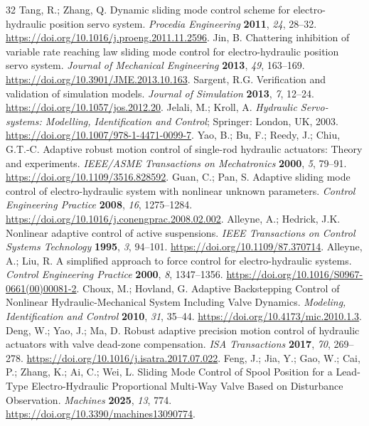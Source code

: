 \begin{thebibliography}{32}
 Tang, R.; Zhang, Q. Dynamic sliding mode control scheme for electro-hydraulic position servo system. \emph{Procedia Engineering} \textbf{2011}, \emph{24}, 28--32. \url{https://doi.org/10.1016/j.proeng.2011.11.2596}.
 Jin, B. Chattering inhibition of variable rate reaching law sliding mode control for electro-hydraulic position servo system. \emph{Journal of Mechanical Engineering} \textbf{2013}, \emph{49}, 163--169. \url{https://doi.org/10.3901/JME.2013.10.163}.
 Sargent, R.G. Verification and validation of simulation models. \emph{Journal of Simulation} \textbf{2013}, \emph{7}, 12--24. \url{https://doi.org/10.1057/jos.2012.20}.
 Jelali, M.; Kroll, A. \emph{Hydraulic Servo-systems: Modelling, Identification and Control}; Springer: London, UK, 2003. \url{https://doi.org/10.1007/978-1-4471-0099-7}.
 Yao, B.; Bu, F.; Reedy, J.; Chiu, G.T.-C. Adaptive robust motion control of single-rod hydraulic actuators: Theory and experiments. \emph{IEEE/ASME Transactions on Mechatronics} \textbf{2000}, \emph{5}, 79--91. \url{https://doi.org/10.1109/3516.828592}.
 Guan, C.; Pan, S. Adaptive sliding mode control of electro-hydraulic system with nonlinear unknown parameters. \emph{Control Engineering Practice} \textbf{2008}, \emph{16}, 1275--1284. \url{https://doi.org/10.1016/j.conengprac.2008.02.002}.
 Alleyne, A.; Hedrick, J.K. Nonlinear adaptive control of active suspensions. \emph{IEEE Transactions on Control Systems Technology} \textbf{1995}, \emph{3}, 94--101. \url{https://doi.org/10.1109/87.370714}.
 Alleyne, A.; Liu, R. A simplified approach to force control for electro-hydraulic systems. \emph{Control Engineering Practice} \textbf{2000}, \emph{8}, 1347--1356. \url{https://doi.org/10.1016/S0967-0661(00)00081-2}.
 Choux, M.; Hovland, G. Adaptive Backstepping Control of Nonlinear Hydraulic-Mechanical System Including Valve Dynamics. \emph{Modeling, Identification and Control} \textbf{2010}, \emph{31}, 35--44. \url{https://doi.org/10.4173/mic.2010.1.3}.
 Deng, W.; Yao, J.; Ma, D. Robust adaptive precision motion control of hydraulic actuators with valve dead-zone compensation. \emph{ISA Transactions} \textbf{2017}, \emph{70}, 269--278. \url{https://doi.org/10.1016/j.isatra.2017.07.022}.
 Feng, J.; Jia, Y.; Gao, W.; Cai, P.; Zhang, K.; Ai, C.; Wei, L. Sliding Mode Control of Spool Position for a Lead-Type Electro-Hydraulic Proportional Multi-Way Valve Based on Disturbance Observation. \emph{Machines} \textbf{2025}, \emph{13}, 774. \url{https://doi.org/10.3390/machines13090774}.

\end{thebibliography}
